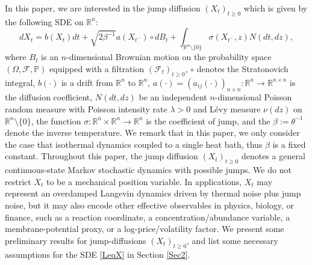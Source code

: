 \documentclass[10pt]{article}
\theoremstyle{definition}
\numberwithin{equation}{section}
\begin{document}
In this paper, we are interested in the jump diffusion $(X_t)_{t\geq 0}$ which is given by the following SDE on $\mathbb{R}^n$:
\begin{equation}\label{LeqX}
    dX_t =  b(X_{t})dt +  \sqrt{2\beta^{-1}} a(X_{t^-}) \circ dB_t  +  \int_{\mathbb{R}^n\setminus\{0\}} \sigma(X_{t^{-}},z) N(dt,dz),
\end{equation}
where $B_t$ is an $n$-dimensional Brownian motion on the probability space $(\Omega, \mathscr{F}, \mathbb{P})$ equipped with a filtration $(\mathscr{F}_t)_{t\geq 0}$, $\circ$ denotes the Stratonovich integral, $b(\cdot)$ is a drift from $\mathbb{R}^n$ to $\mathbb{R}^n$, $a(\cdot)=(a_{ij}(\cdot))_{n\times n}:\mathbb{R}^n \rightarrow  \mathbb{R}^{n \times n}$ is the diffusion coefficient, $N(dt,dz)$ be an independent $n$-dimensional Poisson random measure with Poisson intensity rate $\lambda>0$ and L\'{e}vy measure $\nu(dz)$ on $\mathbb{R}^n \setminus\{0\}$, the function $\sigma:\mathbb{R}^n \times \mathbb{R}^n \rightarrow  \mathbb{R}^{n}$ is the coefficient of jump, and the $\beta:=\theta^{-1}$ denote the inverse temperature.
We remark that in this paper, we only consider the case that isothermal dynamics coupled to a single heat bath, thus $\beta$ is a fixed constant.
Throughout this paper, the jump diffusion $(X_t)_{t\ge0}$ denotes a general continuous-state Markov stochastic dynamics with possible jumps. We do not restrict $X_t$ to be a mechanical position variable. In applications, $X_t$ may represent an overdamped Langevin dynamics driven by thermal noise plus jump noise, but it may also encode other effective observables in physics, biology, or finance, such as a reaction coordinate, a concentration/abundance variable, a membrane-potential proxy, or a log-price/volatility factor. 
We present some preliminary results for jump-diffusions $(X_t)_{t\geq 0}$, and list some necessary assumptions for the SDE \eqref{LeqX} in Section \ref{Sec2}.
\end{document}
